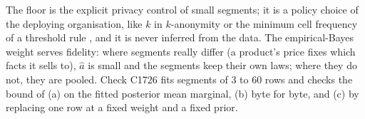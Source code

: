 \noindent The floor is the explicit privacy control of small segments; it is a policy choice of the deploying organisation, like $k$ in $k$-anonymity \cite{sweeney2002} or the minimum cell frequency of a threshold rule \cite{hundepool2012}, and it is never inferred from the data. The empirical-Bayes weight serves fidelity: where segments really differ (a product's price fixes which facts it sells to), $\hat a$ is small and the segments keep their own laws; where they do not, they are pooled. Check C1726 fits segments of 3 to 60 rows and checks the bound of (a) on the fitted posterior mean marginal, (b) byte for byte, and (c) by replacing one row at a fixed weight and a fixed prior.

\setcounter{proposition}{\value{savedpropgthree}}
